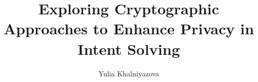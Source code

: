 \title{Exploring Cryptographic Approaches to Enhance Privacy in Intent Solving}
\begin{authgrp}
\author{Yulia Khalniyazova}
\end{authgrp}


\releaseval{\today}
\updatedval{\today}
